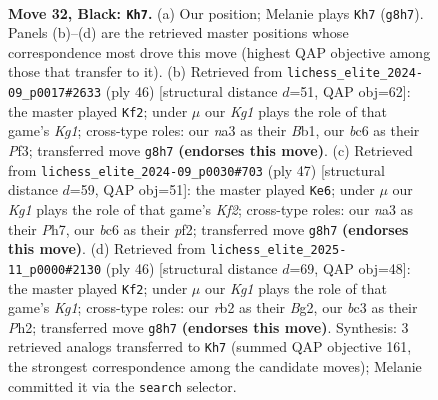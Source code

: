 \documentclass[11pt]{article}
\begin{document}
\clearpage

\begin{figure}[p]\centering
\begin{subfigure}{0.46\textwidth}\centering
\resizebox{\linewidth}{!}{%
\newchessgame
\chessboard[
  setfen={1r3rk1/p4p2/bpB1p1pp/2n5/2P5/N1B1P2P/PR3PP1/5KR1 b - - 10 32},
  showmover=false,
  pgfstyle=straightmove, color=movearrow, markmove={g8-h7}
]}
\caption{}
\end{subfigure}\hfill
\begin{subfigure}{0.46\textwidth}\centering
\resizebox{\linewidth}{!}{%
\newchessgame
\chessboard[
  setfen={5rk1/p2r2pp/1pn5/1Np2b2/P1P5/3P1P2/6PP/RB3RK1 w - - 0 24},
  showmover=false,
  pgfstyle=straightmove, color=movearrow, markmove={g1-f2}
]}
\caption{}
\end{subfigure}
\\[4pt]
\begin{subfigure}{0.46\textwidth}\centering
\resizebox{\linewidth}{!}{%
\newchessgame
\chessboard[
  setfen={3r1r2/p4k1p/3p1pp1/2p1n3/8/1P2B1P1/P2RPPKP/3R4 b - - 3 24},
  showmover=false,
  pgfstyle=straightmove, color=movearrow, markmove={f7-e6}
]}
\caption{}
\end{subfigure}\hfill
\begin{subfigure}{0.46\textwidth}\centering
\resizebox{\linewidth}{!}{%
\newchessgame
\chessboard[
  setfen={3r1k2/1br2ppp/2p1p3/ppP5/3P1P2/3R2P1/PP4BP/3R2K1 w - - 1 24},
  showmover=false,
  pgfstyle=straightmove, color=movearrow, markmove={g1-f2}
]}
\caption{}
\end{subfigure}
\caption{\textbf{Move 32, Black: \texttt{Kh7}.} (a) Our position; Melanie plays \texttt{Kh7} (\texttt{g8h7}). Panels (b)--(d) are the retrieved master positions whose correspondence most drove this move (highest QAP objective among those that transfer to it). (b) Retrieved from \texttt{lichess\_elite\_2024-09\_p0017\#2633} (ply 46) [structural distance $d$=51, QAP obj=62]: the master played \texttt{Kf2}; under $\mu$ our \emph{Kg1} plays the role of that game's \emph{Kg1}; cross-type roles: our \emph{n}a3 as their \emph{B}b1, our \emph{b}c6 as their \emph{P}f3; transferred move \texttt{g8h7} \textbf{(endorses this move)}. (c) Retrieved from \texttt{lichess\_elite\_2024-09\_p0030\#703} (ply 47) [structural distance $d$=59, QAP obj=51]: the master played \texttt{Ke6}; under $\mu$ our \emph{Kg1} plays the role of that game's \emph{Kf2}; cross-type roles: our \emph{n}a3 as their \emph{P}h7, our \emph{b}c6 as their \emph{p}f2; transferred move \texttt{g8h7} \textbf{(endorses this move)}. (d) Retrieved from \texttt{lichess\_elite\_2025-11\_p0000\#2130} (ply 46) [structural distance $d$=69, QAP obj=48]: the master played \texttt{Kf2}; under $\mu$ our \emph{Kg1} plays the role of that game's \emph{Kg1}; cross-type roles: our \emph{r}b2 as their \emph{B}g2, our \emph{b}c3 as their \emph{P}h2; transferred move \texttt{g8h7} \textbf{(endorses this move)}. Synthesis: 3 retrieved analogs transferred to \texttt{Kh7} (summed QAP objective 161, the strongest correspondence among the candidate moves); Melanie committed it via the \texttt{search} selector.}
\label{fig:thought-m63}
\end{figure}
\end{document}
